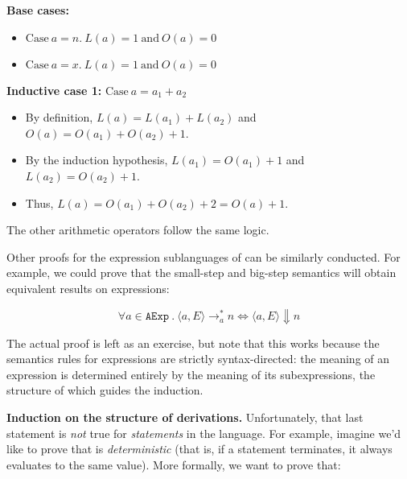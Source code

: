 \documentclass[11pt]{article}
\begin{document}
\vspace{1ex}
\noindent\textbf{Base cases:}
\begin{itemize}[labelwidth=0.7em, labelsep=0.6em, topsep=0ex, itemsep=0ex,
  parsep=0ex] 
\item $\mbox{Case}~ a = n .\  L(a) = 1 ~\mbox{and}~ O(a) = 0$
\item $\mbox{Case}~ a = x .\ L(a) = 1 ~\mbox{and}~ O(a) = 0$
\end{itemize}

\noindent\textbf{Inductive case 1:} $\mbox{Case}~a = a_1 + a_2$ 
\begin{itemize}[labelwidth=0.7em, labelsep=0.6em, topsep=0ex, itemsep=0ex,
  parsep=0ex] 
\item By definition, $L(a) = L(a_1) + L(a_2)$ and $O(a) = O(a_1) + O(a_2) + 1$.
\item By the induction hypothesis, $L(a_1) = O(a_1) + 1$ and $L(a_2) = O(a_2) + 1$.
\item Thus, $L(a) = O(a_1) + O(a_2) + 2 = O(a) + 1.$
\end{itemize}

\vspace{1ex}
\noindent The other arithmetic operators follow the same logic.

\vspace{1ex} Other proofs for the expression sublanguages of \WhileLang can be
similarly conducted.  For example, we could prove that the small-step and
big-step semantics will obtain equivalent results on expressions:

\begin{equation*}
\forall a \in \mathtt{AExp}\ .\ \langle a, E \rangle \rightarrow_a^* n \Leftrightarrow \langle a, E \rangle \Downarrow n
\end{equation*}

The actual proof is left as an exercise, but note that this works because the
semantics rules for expressions are strictly syntax-directed: the meaning of an
expression is determined entirely by the meaning of its subexpressions, the
structure of which guides the induction.

\vspace{1ex}
\noindent\textbf{Induction on the structure of derivations.} Unfortunately, that last
statement is \emph{not} true for \emph{statements} in the \WhileLang language.  For
example, imagine we'd like to prove that \WhileLang is \emph{deterministic} (that
is, if a statement terminates, it always evaluates to the same value).  More
formally, we want to prove that:
\end{document}
